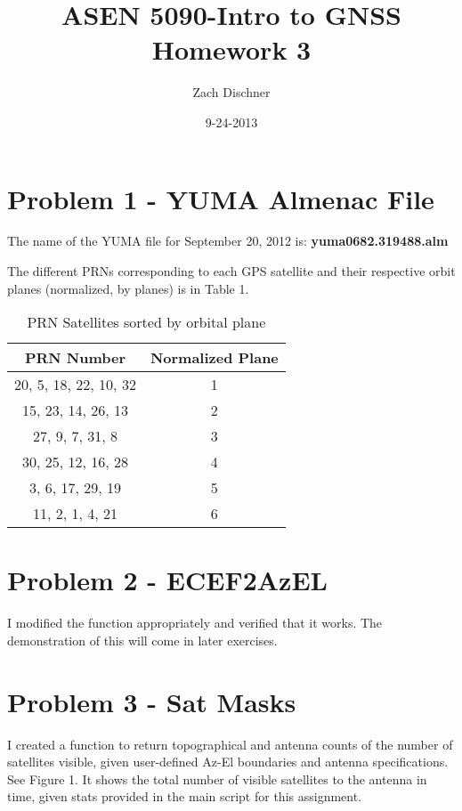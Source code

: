 \documentclass[12pt,a4paper,oneside]{article}
\begin{document}
	
	\title{ASEN 5090-Intro to GNSS Homework 3}
	\author{Zach Dischner}
	\date{9-24-2013}
	\maketitle

\section{Problem 1 - YUMA Almenac File}
The name of the YUMA file for September 20, 2012 is: \textbf{yuma0682.319488.alm}

The different PRNs corresponding to each GPS satellite and their respective orbit planes (normalized, by planes) is in Table 1. 

\begin{table}[H]
	\centering
	\begin{tabular}{|c|c|}
		\hline
		\textbf{PRN Number} &	\textbf{Normalized Plane}	 \\\hline
		    20, 5, 18, 22, 10, 32&     1\\\hline
		    15, 23, 14, 26, 13 &     2\\\hline
		    27, 9, 7, 31, 8&     3\\\hline
		    30, 25, 12, 16, 28&     4\\\hline
		     3, 6, 17, 29, 19&     5\\\hline
		    11, 2, 1, 4, 21&     6\\\hline
	\end{tabular}
	\caption{PRN Satellites sorted by orbital plane}
\end{table}



\section{Problem 2 - ECEF2AzEL}
I modified the function appropriately and verified that it works. The demonstration of this will come in later exercises. 

\section{Problem 3 - Sat Masks} 
I created a function to return topographical  and antenna counts of the number of satellites visible, given user-defined Az-El boundaries and antenna specifications. See Figure 1. It shows the total number of visible satellites to the antenna in time, given stats provided in the main script for this assignment. 
\end{document}
